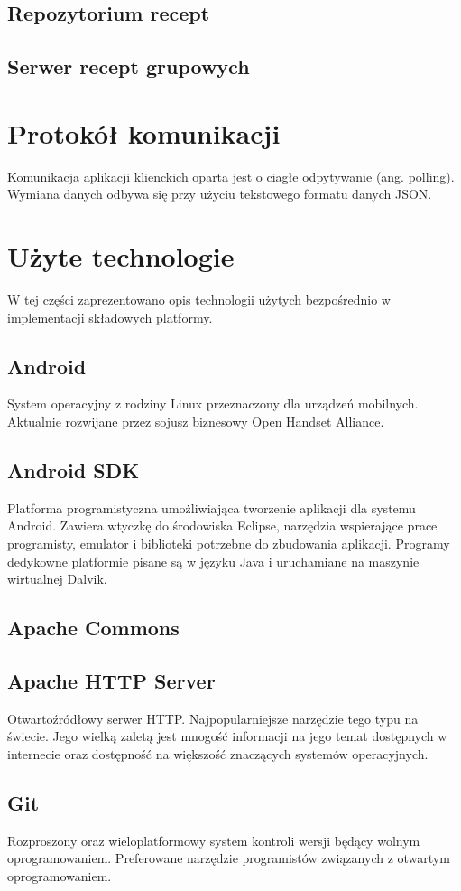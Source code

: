 \documentclass[11pt,a4paper,polish,thesis]{dcsbook}
\begin{document}
\subsection{Repozytorium recept}
\subsection{Serwer recept grupowych}
\section{Protokół komunikacji}
Komunikacja aplikacji klienckich oparta jest o ciagłe odpytywanie (ang. polling). 
Wymiana danych odbywa się przy użyciu tekstowego formatu danych JSON. 






\section{Użyte technologie}
W tej części zaprezentowano opis technologii użytych bezpośrednio w implementacji składowych platformy.
\subsection{Android}
System operacyjny z rodziny Linux przeznaczony dla urządzeń mobilnych. Aktualnie rozwijane przez sojusz biznesowy Open Handset Alliance.
\subsection{Android SDK}
Platforma programistyczna umożliwiająca tworzenie aplikacji dla systemu Android. Zawiera wtyczkę do środowiska Eclipse, narzędzia wspierające prace programisty, emulator i biblioteki potrzebne do zbudowania aplikacji. Programy dedykowne platformie pisane są w języku Java i uruchamiane na maszynie wirtualnej Dalvik.
\subsection{Apache Commons}
\subsection{Apache HTTP Server}
Otwartoźródłowy serwer HTTP. Najpopularniejsze narzędzie tego typu na świecie. Jego wielką zaletą jest mnogość informacji na jego temat dostępnych w internecie oraz
dostępność na większość znaczących systemów operacyjnych.
\subsection{Git}
Rozproszony oraz wieloplatformowy system kontroli wersji będący wolnym oprogramowaniem. Preferowane narzędzie programistów związanych z otwartym oprogramowaniem.
\end{document}

